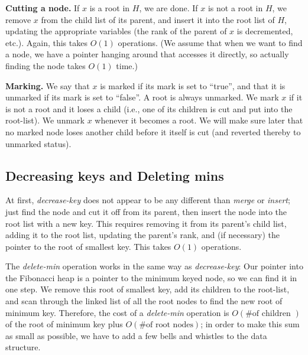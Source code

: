 \documentclass{article}
\begin{document}
\vspace{.25cm}

\noindent \textbf{Cutting a node.} If $x$ is a root in $H$, we are
done. If $x$ is not a root in $H$, we remove $x$ from the child list
of its parent, and insert it into the root list of $H$, updating the
appropriate variables (the rank of the parent of $x$ is decremented,
etc.). Again, this takes $O(1)$ operations. (We assume that when we
want to find a node, we have a pointer hanging around that accesses it
directly, so actually finding the node takes $O(1)$ time.)

\vspace{.25cm}

\noindent \textbf{Marking.} We say that $x$ is marked if its mark is set
to ``true'', and that it is unmarked if its mark is set to ``false''. A
root is always unmarked. We mark $x$ if it is not a root and it loses a
child (i.e., one of its children is cut and put into the root-list). We
unmark $x$ whenever it becomes a root. We
will make sure later that no marked node loses another child before it
itself is cut (and reverted thereby to unmarked status).

\subsection{Decreasing keys and Deleting mins}

\noindent At first, \emph{decrease-key} does not appear to be any
different than \emph{merge} or \emph{insert}; just find the node and cut
it off from its parent, then insert the node into the root list with a
new key. This requires removing it from its parent's
child list, adding it to the root list, updating the parent's rank,
and (if necessary) the pointer to the root of smallest key. This takes
$O(1)$ operations.

\vspace{.25cm}

\noindent The \emph{delete-min} operation works in the same way as
\emph{decrease-key}: Our pointer into the Fibonacci heap is a pointer to
the minimum keyed node, so we can find it in one step.
We remove this root of smallest key, add
its children to the root-list, and scan through the linked list of all
the root nodes to find the new root of minimum
key. Therefore, the cost of a \emph{delete-min} operation is $O(\mbox{\# of
children })$ of the root of minimum key plus $O(\mbox{\# of root
nodes})$; in order to make this sum as small as
possible, we have to add a few bells and whistles to the data structure.
\end{document}
